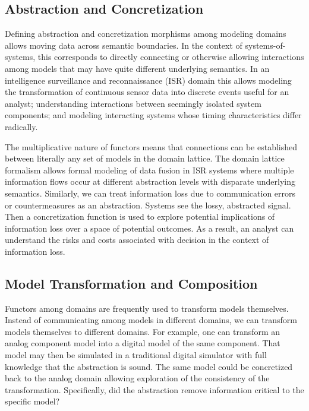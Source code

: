 \documentclass[12pt]{article}
\begin{document}
\subsection{Abstraction and Concretization}

Defining abstraction and concretization morphisms among modeling domains allows moving
data across semantic boundaries.  In the context of systems-of-systems, this corresponds
to directly connecting or otherwise allowing interactions among models that may have quite
different underlying semantics.  In an intelligence surveillance and reconnaissance (ISR)
domain this allows modeling the transformation of continuous sensor data into discrete
events useful for an analyst; understanding interactions between seemingly isolated system
components; and modeling interacting systems whose timing characteristics differ
radically.

The multiplicative nature of functors means that connections can be established between
literally any set of models in the domain lattice.  The domain lattice formalism allows
formal modeling of data fusion in ISR systems where multiple information flows occur at
different abstraction levels with disparate underlying semantics.  Similarly, we can treat
information loss due to communication errors or countermeasures as an abstraction.
Systems see the lossy, abstracted signal. Then a concretization function is used to
explore potential implications of information loss over a space of potential outcomes.  As
a result, an analyst can understand the risks and costs associated with decision in the
context of information loss.  


\subsection{Model Transformation and Composition}

Functors among domains are frequently used to transform models themselves.  Instead of
communicating among models in different domains, we can transform models themselves to
different domains.  For example, one can transform an analog component model into a
digital model of the same component.  That model may then be simulated in a traditional
digital simulator with full knowledge that the abstraction is sound.  The same model could
be concretized back to the analog domain allowing exploration of the consistency of the
transformation.  Specifically, did the abstraction remove information critical to the
specific model?
\end{document}
